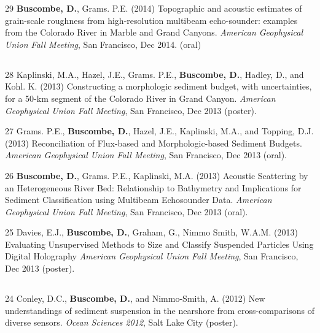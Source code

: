 \documentclass[margin,line]{resume}
\begin{document}
\begin{resume}
\begin{footnotesize}
\begin{list1}
        \item[29] {\bf Buscombe, D.}, Grams. P.E. (2014) Topographic and acoustic estimates of grain-scale roughness from high-resolution multibeam echo-sounder: examples from the Colorado River in Marble and Grand Canyons. {\sl American Geophysical Union Fall Meeting}, San Francisco, Dec 2014. (oral)
	\end{list1}
	
	\subsection{}
	\begin{list1}
	\item[28] Kaplinski, M.A., Hazel, J.E., Grams. P.E., {\bf Buscombe, D.}, Hadley, D., and Kohl. K. (2013) Constructing a morphologic sediment budget, with uncertainties, for a 50-km segment of the Colorado River in Grand Canyon.  {\sl American Geophysical Union Fall Meeting}, San Francisco, Dec 2013 (poster).\\

	\item[27] Grams. P.E., {\bf Buscombe, D.}, Hazel, J.E., Kaplinski, M.A., and Topping, D.J. (2013) Reconciliation of Flux-based and Morphologic-based Sediment Budgets. {\sl American Geophysical Union Fall Meeting}, San Francisco, Dec 2013 (oral). \\

	\item[26] {\bf Buscombe, D.}, Grams. P.E., Kaplinski, M.A. (2013) Acoustic Scattering by an Heterogeneous River Bed: Relationship to Bathymetry and Implications for Sediment Classification using Multibeam Echosounder Data. {\sl American Geophysical Union Fall Meeting}, San Francisco, Dec 2013 (oral). \\

	\item[25] Davies, E.J., {\bf Buscombe, D.}, Graham, G., Nimmo Smith, W.A.M. (2013) Evaluating Unsupervised Methods to Size and Classify Suspended Particles Using Digital Holography {\sl American Geophysical Union Fall Meeting}, San Francisco, Dec 2013 (poster). 
	\end{list1}

	\subsection{}
	\begin{list1}
        \item[24] Conley, D.C., {\bf Buscombe, D.}, and Nimmo-Smith, A. (2012) New understandings of sediment suspension in the nearshore from cross-comparisons of diverse  sensors. {\sl Ocean Sciences 2012}, Salt Lake City (poster).\\


\end{list1}
\end{footnotesize}
\end{resume}
\end{document}
